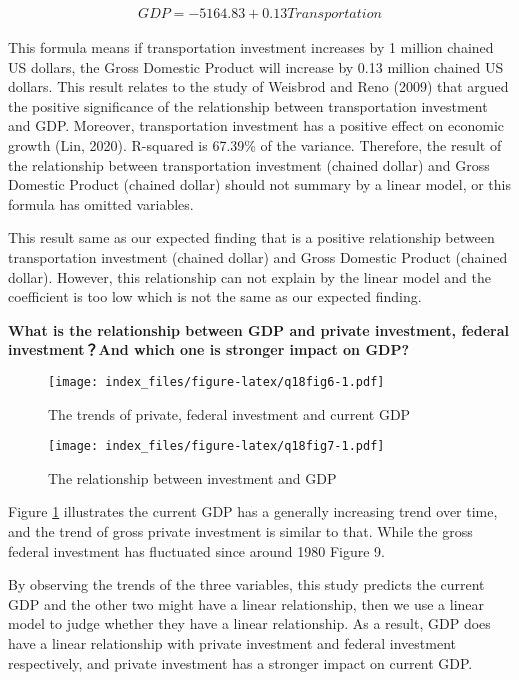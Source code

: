 \documentclass[
]{article}
\begin{document}
\[
\begin{align*}
{GDP} = -5164.83 + 0.13{Transportation}
\end{align*}
\]

This formula means if transportation investment increases by 1 million chained US dollars, the Gross Domestic Product will increase by 0.13 million chained US dollars. This result relates to the study of Weisbrod and Reno (2009) that argued the positive significance of the relationship between transportation investment and GDP. Moreover, transportation investment has a positive effect on economic growth (Lin, 2020). R-squared is 67.39\% of the variance. Therefore, the result of the relationship between transportation investment (chained dollar) and Gross Domestic Product (chained dollar) should not summary by a linear model, or this formula has omitted variables.

This result same as our expected finding that is a positive relationship between transportation investment (chained dollar) and Gross Domestic Product (chained dollar). However, this relationship can not explain by the linear model and the coefficient is too low which is not the same as our expected finding.

\textbf{What is the relationship between GDP and private investment, federal investment？And which one is stronger impact on GDP?}

\begin{figure}
\centering
\texttt{[image: index\_files/figure-latex/q18fig6-1.pdf]}
\caption{\label{fig:q18fig6}The trends of private, federal investment and current GDP}
\end{figure}

\begin{figure}
\centering
\texttt{[image: index\_files/figure-latex/q18fig7-1.pdf]}
\caption{\label{fig:q18fig7}The relationship between investment and GDP}
\end{figure}

Figure \ref{fig:q18fig6} illustrates the current GDP has a generally increasing trend over time, and the trend of gross private investment is similar to that. While the gross federal investment has fluctuated since around 1980 Figure 9.

By observing the trends of the three variables, this study predicts the current GDP and the other two might have a linear relationship, then we use a linear model to judge whether they have a linear relationship. As a result, GDP does have a linear relationship with private investment and federal investment respectively, and private investment has a stronger impact on current GDP.
\end{document}
